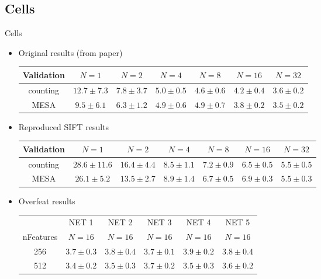 \documentclass[11pt)]{beamer}
\begin{document}
\subsection{Cells}
\begin{frame}{Cells}
\begin{itemize}
\item Original results (from paper)
\begin{table}
\tiny
\begin{tabular}{|c|c|c|c|c|c|c|}
\hline
Validation & $N=1$ & $N=2$ & $N=4$ & $N=8$ & $N=16$ & $N=32$ \\ \hline
counting & $12.7 \pm 7.3$ & $7.8 \pm 3.7$ & $5.0 \pm 0.5$ & $4.6 \pm 0.6$ & $4.2 \pm 0.4$ & $3.6 \pm 0.2$ \\ \hline
MESA & $9.5 \pm 6.1$ & $6.3 \pm 1.2$ & $4.9 \pm 0.6$ & $4.9 \pm 0.7$ & $3.8 \pm 0.2$ & $3.5 \pm 0.2$ \\ \hline
\end{tabular}
\normalsize
\end{table}

\item Reproduced SIFT results
\begin{table}
\tiny
\begin{tabular}{|c|c|c|c|c|c|c|}
\hline
Validation & $N=1$ & $N=2$ & $N=4$ & $N=8$ & $N=16$ & $N=32$ \\ \hline
counting & $28.6 \pm 11.6$ & $16.4 \pm 4.4$ & $8.5 \pm 1.1$ & $7.2 \pm 0.9$ & $6.5 \pm 0.5$ & $5.5 \pm 0.5$ \\ \hline
MESA & $26.1 \pm 5.2$ & $13.5 \pm 2.7$ & $8.9 \pm 1.4$ & $6.7 \pm 0.5$ & $6.9 \pm 0.3$ & $5.5 \pm 0.3$ \\ \hline
\end{tabular}
\normalsize
\end{table}

\item Overfeat results
\begin{table}
\tiny
\begin{tabular}{|c|c|c|c|c|c|}
\hline
& NET 1 & NET 2 & NET 3 & NET 4 & NET 5 \\
nFeatures & $N=16$ & $N=16$ & $N=16$ & $N=16$ & $N=16$  \\ \hline
256 & $3.7 \pm 0.3$ & $3.8 \pm 0.4$ & $3.7 \pm 0.1$ & $3.9 \pm 0.2$ & $3.8 \pm 0.4$ \\ \hline
512 & $3.4 \pm 0.2$ & $3.5 \pm 0.3$ & $3.7 \pm 0.2$ & $3.5 \pm 0.3$ & $3.6 \pm 0.2$ \\ \hline
\end{tabular}
\normalsize
\end{table}
\end{itemize}
\end{frame}
\end{document}
